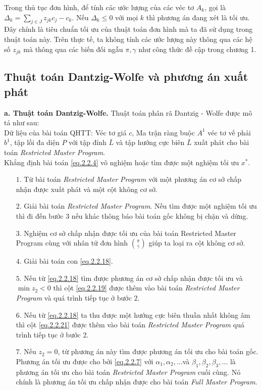 \begin{remark}
Trong thủ tục đơn hình, để tính các ước lượng của các véc tơ $A_k$, gọi là $\Delta_k = \sum_{j\in J}z_{jk}c_j - c_k$. Nếu $\Delta_k\leq 0$ với mọi $k$ thì phương án đang xét là tối ưu. Đây chính là tiêu chuẩn tối ưu của thuật toán đơn hình mà ta đã sử dụng trong thuật toán này. Trên thực tế, ta không tính các ước lượng này thông qua các hệ số $z_{jk}$ mà thông qua các biến đối ngẫu $\pi, \gamma$ như công thức đề cập trong chương 1.
\end{remark}

\subsection{Thuật toán Dantzig-Wolfe và phương án xuất phát}
\textbf{a. Thuật toán Dantzig-Wolfe. } Thuật toán phân rã Dantzig - Wolfe được mô tả như sau:\\
 Dữ liệu của bài toán QHTT: Véc tơ giá $c$, Ma trận ràng buộc $A^1$ véc tơ vế phải $b^1$, tập lồi đa diện $P$ với tập đỉnh $\bar L$ và tập hướng cực biên $\bar L$ xuất phát cho bài toán {\it Restricted Master Program}.\\
 Khẳng định bài toán \eqref{eq.2.2.4} vô nghiệm hoặc tìm được một nghiệm tối ưu $x^{*}$.\\
\begin{itemize}
\item[$1.$ ] Từ bài toán {\it Restricted Master Program} với một phương án cơ sở chấp nhận được xuất phát và một cột không cơ sở.
\item[$2.$ ] Giải bài toán {\it Restricted Master Program}. Nếu tìm được một nghiệm tối ưu thì đi đến bước 3 nếu khác thông báo bài toán gốc không bị chặn và dừng.
\item[$3.$ ] Nghiệm cơ sở chấp nhận được tối ưu của bài toán Restricted Master Program cùng với nhân tử đơn hình $\binom{\overline\pi}{\overline\gamma}$ giúp ta loại ra cột không cơ sở.
\item[$4.$ ] Giải bài toán con \eqref{eq.2.2.18}.
\item[$5.$ ] Nếu từ \eqref{eq.2.2.18} tìm được phương án cơ sở chấp nhận được tối ưu và $\min z_2 < 0 $ thì cột \eqref{eq.2.2.19} được thêm vào bài toán {\it Restricted Master Program} và quá trình tiếp tục ở bước 2.
\item[$6.$] Nếu từ \eqref{eq.2.2.18} ta thu được một hướng cực biên thuần nhất không âm thì cột \eqref{eq.2.2.21} được thêm vào bài toán {\it Restricted Master Program} quá trình tiếp tục ở bước 2.
\item[$7.$] Nếu $z_2=0$, từ phương án này tìm được phương án tối ưu cho bài toán gốc. Phương án tối ưu được cho bởi \eqref{eq.2.2.7} với $\alpha_1,\alpha_2,\dots$và $\beta_1,\beta_2,\beta_3,\dots$ là phương án tối ưu cho bài toán {\it Restricted Master Program} cuối cùng. Nó chính là phương án tối ưu chấp nhận được cho bài toán {\it Full Master Program}.
\end{itemize}
